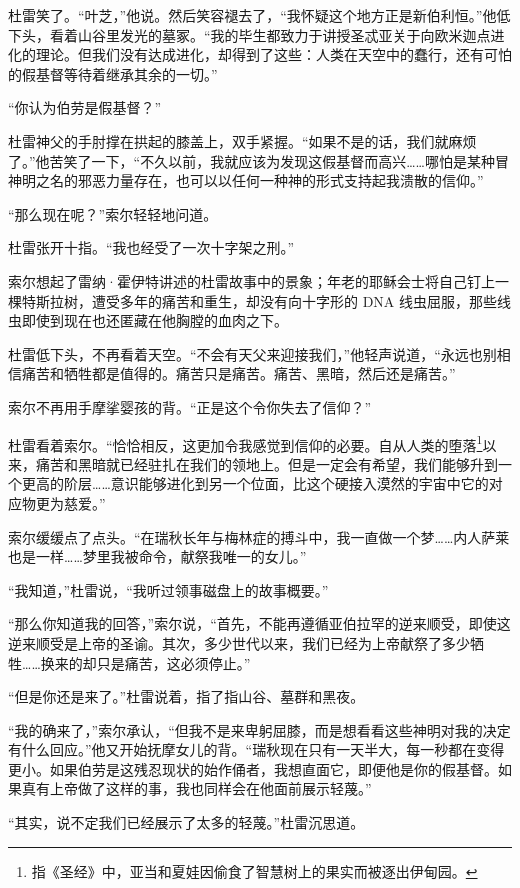 \documentclass[AutoFakeBold=true]{book}
\begin{document}
杜雷笑了。``叶芝，''他说。然后笑容褪去了，``我怀疑这个地方正是新伯利恒。''他低下头，看着山谷里发光的墓冢。``我的毕生都致力于讲授圣忒亚关于向欧米迦点进化的理论。但我们没有达成进化，却得到了这些：人类在天空中的蠢行，还有可怕的假基督等待着继承其余的一切。''

``你认为伯劳是假基督？''

杜雷神父的手肘撑在拱起的膝盖上，双手紧握。``如果不是的话，我们就麻烦了。''他苦笑了一下，``不久以前，我就应该为发现这假基督而高兴……哪怕是某种冒神明之名的邪恶力量存在，也可以以任何一种神的形式支持起我溃散的信仰。''

``那么现在呢？''索尔轻轻地问道。

杜雷张开十指。``我也经受了一次十字架之刑。''

索尔想起了雷纳·霍伊特讲述的杜雷故事中的景象；年老的耶稣会士将自己钉上一棵特斯拉树，遭受多年的痛苦和重生，却没有向十字形的 DNA 线虫屈服，那些线虫即使到现在也还匿藏在他胸膛的血肉之下。

杜雷低下头，不再看着天空。``不会有天父来迎接我们，''他轻声说道，``永远也别相信痛苦和牺牲都是值得的。痛苦只是痛苦。痛苦、黑暗，然后还是痛苦。''

索尔不再用手摩挲婴孩的背。``正是这个令你失去了信仰？''

杜雷看着索尔。``恰恰相反，这更加令我感觉到信仰的必要。自从人类的堕落\footnote{指《圣经》中，亚当和夏娃因偷食了智慧树上的果实而被逐出伊甸园。}以来，痛苦和黑暗就已经驻扎在我们的领地上。但是一定会有希望，我们能够升到一个更高的阶层……意识能够进化到另一个位面，比这个硬接入漠然的宇宙中它的对应物更为慈爱。''

索尔缓缓点了点头。``在瑞秋长年与梅林症的搏斗中，我一直做一个梦……内人萨莱也是一样……梦里我被命令，献祭我唯一的女儿。''

``我知道，''杜雷说，``我听过领事磁盘上的故事概要。''

``那么你知道我的回答，''索尔说，``首先，不能再遵循亚伯拉罕的逆来顺受，即使这逆来顺受是上帝的圣谕。其次，多少世代以来，我们已经为上帝献祭了多少牺牲……换来的却只是痛苦，这必须停止。''

``但是你还是来了。''杜雷说着，指了指山谷、墓群和黑夜。

``我的确来了，''索尔承认，``但我不是来卑躬屈膝，而是想看看这些神明对我的决定有什么回应。''他又开始抚摩女儿的背。``瑞秋现在只有一天半大，每一秒都在变得更小。如果伯劳是这残忍现状的始作俑者，我想直面它，即便他是你的假基督。如果真有上帝做了这样的事，我也同样会在他面前展示轻蔑。''

``其实，说不定我们已经展示了太多的轻蔑。''杜雷沉思道。
\end{document}
